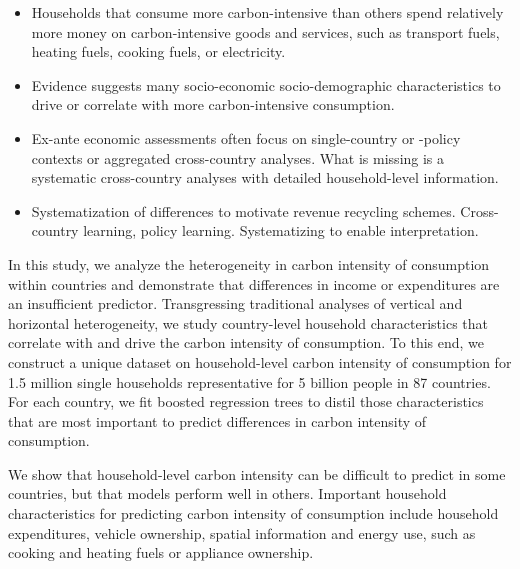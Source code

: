 \documentclass[12pt, a4paper]{article}
\begin{document}
\begin{itemize}
  \item Households that consume more carbon-intensive than others spend relatively more money on carbon-intensive goods and services, such as transport fuels, heating fuels, cooking fuels, or electricity.
  \item Evidence suggests many socio-economic socio-demographic characteristics to drive or correlate with more carbon-intensive consumption.
  \item Ex-ante economic assessments often focus on single-country or -policy contexts or aggregated cross-country analyses. What is missing is a systematic cross-country analyses with detailed household-level information.
  \item Systematization of differences to motivate revenue recycling schemes. Cross-country learning, policy learning. Systematizing to enable interpretation.
\end{itemize}


In this study, we analyze the heterogeneity in carbon intensity of consumption within countries and demonstrate that differences in income or expenditures are an insufficient predictor. Transgressing traditional analyses of vertical and horizontal heterogeneity, we study country-level household characteristics that correlate with and drive the carbon intensity of consumption. To this end, we construct a unique dataset on household-level carbon intensity of consumption for 1.5 million single households representative for 5 billion people in 87 countries. For each country, we fit boosted regression trees to distil those characteristics that are most important to predict differences in carbon intensity of consumption. 

We show that household-level carbon intensity  can be difficult to predict in some countries, but that models perform well in others. Important household characteristics for predicting carbon intensity of consumption include household expenditures, vehicle ownership, spatial information and energy use, such as cooking and heating fuels or appliance ownership. 

\end{document}
